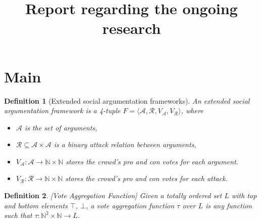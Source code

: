 \documentclass{article}
\date{ }
\newtheorem{definition}{Definition}
\newcommand{\nat}{\mathbb{N}}   %
\newcommand{\args}{\mathcal{A}} %
\newcommand{\att}{\mathcal{R}}  %
\newcommand{\valueset}{L}
\newcommand{\varg}{V_{\args}}   %
\newcommand{\vatt}{V_{\att}}   %
\newcommand{\safid}{F}               %
\newcommand{\saf}{\safid = \safbody} %
\newcommand{\safbody}{\langle \args, \att, \varg, \vatt \rangle} %
\begin{document}
\title{Report regarding the ongoing research}

\maketitle






\section{Main}


\begin{definition}[Extended social argumentation frameworks]
An \emph{extended social argumentation framework} is a 4-tuple $\saf$, where
\begin{itemize}
  \item $\args$ is the set of arguments,
  \item $\att \subseteq \args \times \args$ is a binary attack relation between arguments,
  \item $\varg : \args \to \nat \times \nat$ stores the crowd's pro and con votes for each argument.
  \item $\vatt : \att \to \nat \times \nat$ stores the crowd's pro and con votes for each attack.
\end{itemize}
\end{definition}

\begin{definition}
\label{def:voteAgg}
[Vote Aggregation Function]
Given a totally ordered set $\valueset$ with top and bottom elements $\top$, $\bot$, a vote aggregation function $\tau$ over $\valueset$ is any function such that $\tau :\nat^{2} \times \nat \to L$.
\end{definition}
\end{document}

